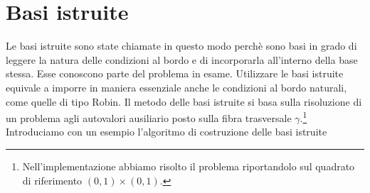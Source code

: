 \section{Basi istruite}
\label{sec: educated basis}
Le basi istruite sono state chiamate in questo modo perch\`e sono basi in grado di leggere la natura 
delle condizioni al bordo e di incorporarla all'interno della base stessa. Esse
conoscono parte del problema in esame.
Utilizzare le basi istruite equivale a imporre in maniera essenziale anche le condizioni al bordo 
naturali, come quelle di tipo Robin.
Il metodo delle basi istruite si basa sulla risoluzione di un problema agli autovalori 
ausiliario posto sulla fibra trasversale $\gamma$.\footnote{Nell'implementazione abbiamo risolto il
problema riportandolo sul quadrato di riferimento $(0,1)\times(0,1)$.} 
Introduciamo con un esempio l'algoritmo di costruzione delle basi istruite
